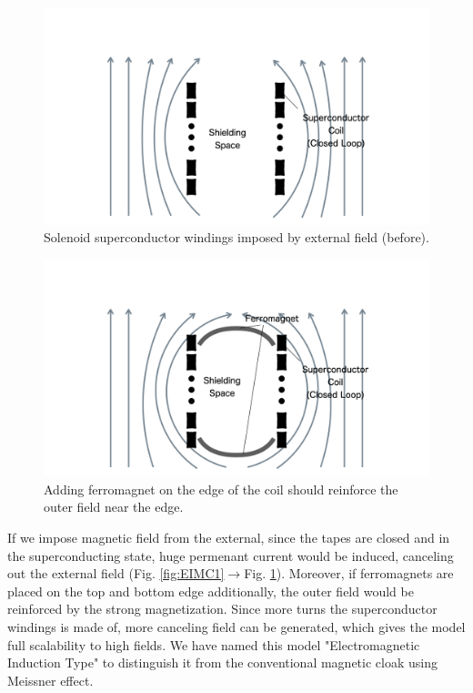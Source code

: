 \begin{figure}[H]
  \includegraphics[width=13cm, bb=9 9 900 550]{./section2Proposal/EMIC2.png}
  \caption{Solenoid superconductor windings imposed by external field (before).}
  \label{fig:EIMC2}
\end{figure}
\begin{figure}[H]
  \includegraphics[width=13cm, bb=9 9 900 550]{./section2Proposal/EMIC3.png}
  \caption{Adding ferromagnet on the edge of the coil should reinforce the outer field near the edge.}
  \label{fig:EIMC3}
\end{figure}
If we impose magnetic field from the external,
since the tapes are closed and in the superconducting state,
huge permenant current would be induced,
canceling out the external field (Fig. \ref{fig:EIMC1}$\to$Fig. \ref{fig:EIMC2}).
Moreover, if ferromagnets are placed on the top and bottom edge additionally,
the outer field would be reinforced by the strong magnetization.
Since more turns the superconductor windings is made of,
more canceling field can be generated,
which gives the model full scalability to high fields.
We have named this model "Electromagnetic Induction Type" to distinguish it from the conventional magnetic cloak using Meissner effect.


